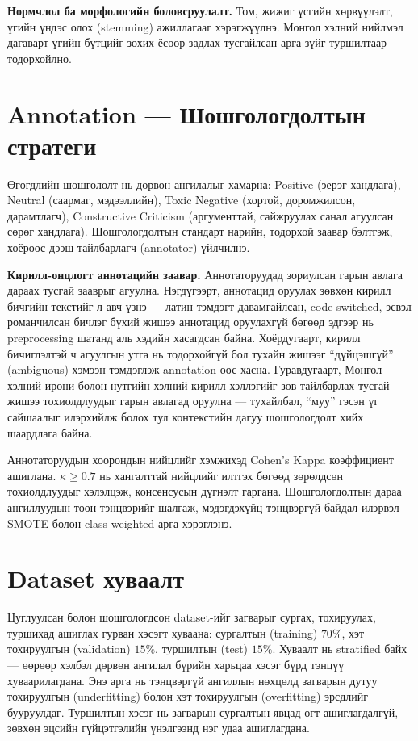\textbf{Нормчлол ба морфологийн боловсруулалт.} Том, жижиг үсгийн хөрвүүлэлт,
үгийн үндэс олох (stemming) ажиллагааг хэрэгжүүлнэ. Монгол хэлний нийлмэл
дагаварт үгийн бүтцийг зохих ёсоор задлах тусгайлсан арга зүйг туршилтаар
тодорхойлно.

\section{Annotation --- Шошгологдолтын стратеги}

Өгөгдлийн шошгололт нь дөрвөн ангилалыг хамарна: Positive (эерэг хандлага),
Neutral (саармаг, мэдээллийн), Toxic Negative (хортой, доромжилсон, дарамтлагч),
Constructive Criticism (аргументтай, сайжруулах санал агуулсан сөрөг хандлага).
Шошгологдолтын стандарт нарийн, тодорхой заавар бэлтгэж, хоёроос дээш
тайлбарлагч (annotator) үйлчилнэ.

\textbf{Кирилл-онцлогт аннотацийн заавар.} Аннотаторуудад зориулсан гарын авлага
дараах тусгай зааврыг агуулна. Нэгдүгээрт, аннотацид оруулах зөвхөн кирилл
бичгийн текстийг л авч үзнэ --- латин тэмдэгт давамгайлсан, code-switched, эсвэл
романчилсан бичлэг бүхий жишээ аннотацид оруулахгүй бөгөөд эдгээр нь
preprocessing шатанд аль хэдийн хасагдсан байна. Хоёрдугаарт, кирилл бичиглэлтэй
ч агуулгын утга нь тодорхойгүй бол тухайн жишээг ``дүйцэшгүй'' (ambiguous)
хэмээн тэмдэглэж annotation-оос хасна. Гуравдугаарт, Монгол хэлний ирони болон
нутгийн хэлний кирилл хэллэгийг зөв тайлбарлах тусгай жишээ тохиолдлуудыг
гарын авлагад оруулна --- тухайлбал, ``муу'' гэсэн үг сайшаалыг илэрхийлж болох
тул контекстийн дагуу шошгологдолт хийх шаардлага байна.

Аннотаторуудын хоорондын нийцлийг хэмжихэд Cohen's Kappa коэффициент ашиглана.
$\kappa \geq 0.7$ нь хангалттай нийцлийг илтгэх бөгөөд зөрөлдсөн тохиолдлуудыг
хэлэлцэж, консенсусын дүгнэлт гаргана. Шошгологдолтын дараа ангиллуудын тоон
тэнцвэрийг шалгаж, мэдэгдэхүйц тэнцвэргүй байдал илэрвэл SMOTE болон
class-weighted арга хэрэглэнэ.

\section{Dataset хуваалт}

Цуглуулсан болон шошгологдсон dataset-ийг загварыг сургах, тохируулах, туршихад
ашиглах гурван хэсэгт хуваана: сургалтын (training) $70\%$, хэт тохируулгын
(validation) $15\%$, туршилтын (test) $15\%$. Хуваалт нь stratified байх ---
өөрөөр хэлбэл дөрвөн ангилал бүрийн харьцаа хэсэг бүрд тэнцүү хуваарилагдана.
Энэ арга нь тэнцвэргүй ангиллын нөхцөлд загварын дутуу тохируулгын
(underfitting) болон хэт тохируулгын (overfitting) эрсдлийг бууруулдаг.
Туршилтын хэсэг нь загварын сургалтын явцад огт ашиглагдалгүй, зөвхөн эцсийн
гүйцэтгэлийн үнэлгээнд нэг удаа ашиглагдана.

